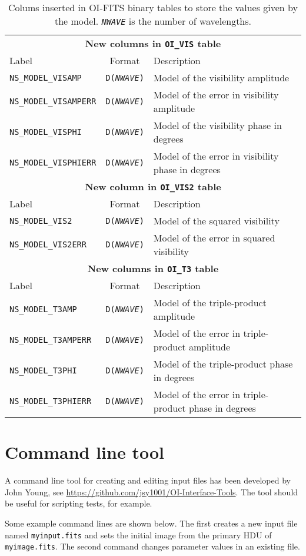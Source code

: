 \documentclass{article}
\newcommand*{\ROW}{} %
\newcommand*{\ROWTITLE}{} %
\newcommand{\oops}[1]{\DarkRed{#1}}
\begin{document}
\renewcommand{\ROW}[2]{\texttt{#1} & \texttt{D(\textsl{NWAVE})} & #2 \\}
\renewcommand{\ROWTITLE}[1]{\multicolumn{3}{c}{\textbf{#1}}\\}

\begin{table}
\caption{Colums inserted in OI-FITS binary tables to store the values given by
the model.  \texttt{\textsl{NWAVE}} is the number of wavelengths.
\label{tab:model-columns}}
\begin{tabular}{lcl}
\hline
\hline
\ROWTITLE{New columns in \texttt{OI\_VIS} table}
Label & Format & Description \\
\hline
\ROW{NS\_MODEL\_VISAMP}{Model of the visibility amplitude}
\ROW{NS\_MODEL\_VISAMPERR}{Model of the error in visibility amplitude \oops{(optional)}}
\ROW{NS\_MODEL\_VISPHI}{Model of the visibility phase in degrees}
\ROW{NS\_MODEL\_VISPHIERR}{Model of the error in visibility phase in degrees \oops{(optional)}}
\hline
\hline
\ROWTITLE{New column in \texttt{OI\_VIS2} table}
Label & Format & Description \\
\hline
\ROW{NS\_MODEL\_VIS2}{Model of the squared visibility}
\ROW{NS\_MODEL\_VIS2ERR}{Model of the error in squared visibility \oops{(optional)}}
\hline
\hline
\ROWTITLE{New columns in \texttt{OI\_T3} table}
Label & Format & Description \\
\hline
\ROW{NS\_MODEL\_T3AMP}{Model of the triple-product amplitude}
\ROW{NS\_MODEL\_T3AMPERR}{Model of the error in triple-product amplitude \oops{(optional)}}
\ROW{NS\_MODEL\_T3PHI}{Model of the triple-product phase in degrees}
\ROW{NS\_MODEL\_T3PHIERR}{Model of the error in triple-product phase in degrees \oops{(optional)}}
\hline
\end{tabular}
\end{table}

\section{Command line tool}

A command line tool for creating and editing input files has been developed
by John Young, see \url{https://github.com/jsy1001/OI-Interface-Tools}. The
tool should be useful for scripting tests, for example.

Some example command lines are shown below. The first creates a new input
file named \verb+myinput.fits+ and sets the initial image from the
primary HDU of \verb+myimage.fits+. The second command changes
parameter values in an existing file.
\end{document}
